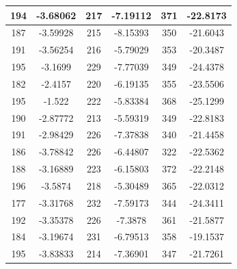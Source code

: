\documentclass{article}
\begin{document}
\begin{tabular}{cccccc}
194&-3.68062&217&-7.19112&371&-22.8173 \\ \hline
187&-3.59928&215&-8.15393&350&-21.6043 \\ \hline
191&-3.56254&216&-5.79029&353&-20.3487 \\ \hline
195&-3.1699&229&-7.77039&349&-24.4378 \\ \hline
182&-2.4157&220&-6.19135&355&-23.5506 \\ \hline
195&-1.522&222&-5.83384&368&-25.1299 \\ \hline
190&-2.87772&213&-5.59319&349&-22.8183 \\ \hline
191&-2.98429&226&-7.37838&340&-21.4458 \\ \hline
186&-3.78842&226&-6.44807&322&-22.5362 \\ \hline
188&-3.16889&223&-6.15803&372&-22.2148 \\ \hline
196&-3.5874&218&-5.30489&365&-22.0312 \\ \hline
177&-3.31768&232&-7.59173&344&-24.3411 \\ \hline
192&-3.35378&226&-7.3878&361&-21.5877 \\ \hline
184&-3.19674&231&-6.79513&358&-19.1537 \\ \hline
195&-3.83833&214&-7.36901&347&-21.7261 \\ \hline
\end{tabular}
\end{document}
